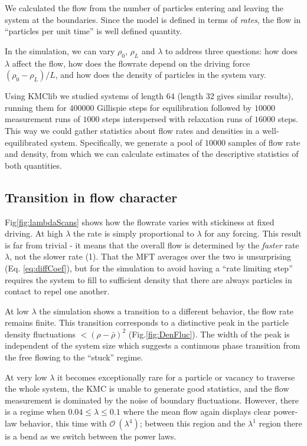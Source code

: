 \documentclass[
reprint, amsmath,amssymb, aps,
]{revtex4-1}
\begin{document}
We calculated the flow from the number of particles entering and
leaving the system at the boundaries.  Since the model is defined in
terms of {\it rates}, the flow in ``particles per unit time'' is well
defined quantity.

In the simulation, we can vary $\rho_0$, $\rho_L$ and $\lambda$ to
address three questions: how does $\lambda$ affect the flow, how does
the flowrate depend on the driving force $(\rho_0 - \rho_L)/L$, and
how does the density of particles in the system vary.

Using KMClib we studied systems of length $64$ (length $32$ gives similar
results), running them for $400000$ Gillispie steps for equilibration
followed by $10000$ measurement runs of $1000$ steps interspersed with
relaxation runs of $16000$ steps. This way we could gather statistics
about flow rates and densities in a well-equilibrated
system. Specifically, we generate a pool of $10000$ samples of flow
rate and density, from which we can calculate estimates of the
descriptive statistics of both quantities.


\subsection{Transition in flow character}

Fig\ref{fig:lambdaScans} shows how the flowrate varies with stickiness
at fixed driving.  At high $\lambda$ the rate is simply proportional
to $\lambda$ for any forcing.  This result is far from trivial - it
means that the overall flow is determined by the {\it faster} rate
$\lambda$, not the slower rate (1).  That the MFT averages over the
two is unsurprising (Eq. \ref{eq:diffCoef}), but for the
simulation to avoid having a ``rate limiting step'' requires the
system to fill to sufficient density that there are always particles
in contact to repel one another.

At low $\lambda$ the simulation shows a transition to a different
behavior, the flow rate remains finite.  This transition corresponds
to a distinctive peak in the particle density fluctuations
$<(\rho-\bar{\rho})^2$ (Fig.\ref{fig:DenFluc}).  The width of the peak is independent of the
system size 
which suggests a continuous
phase transition from the free flowing to the ``stuck'' regime.

At very low
$\lambda$ it becomes exceptionally rare for a particle or vacancy to
traverse the whole system, the KMC is unable to generate good statistics, 
and the flow measurement is dominated by
the noise of boundary fluctuations.
However, there is a regime when $0.04 \le \lambda \le 0.1$
where the mean flow again displays clear power-law behavior, this time
with $\mathcal{O}~(\lambda^{4})$; between this region and the
$\lambda^1$ region there is a bend as we switch between the power laws.
\end{document}
